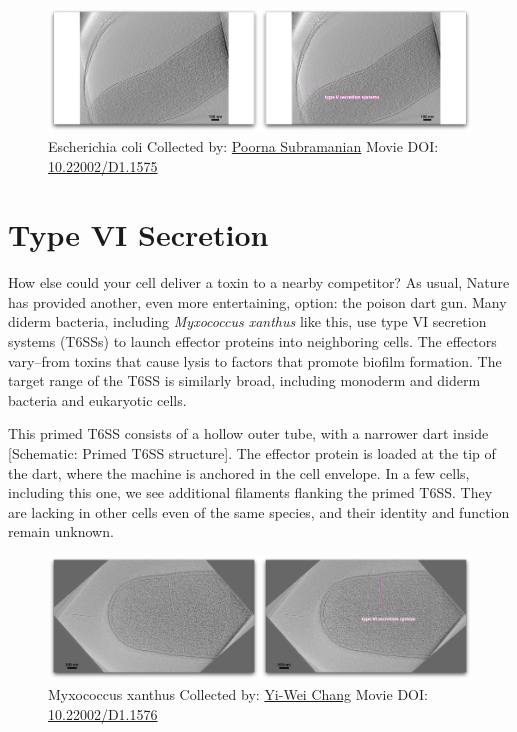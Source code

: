 \documentclass[]{tufte-book}
\begin{document}
\begin{figure}
\includegraphics{movie_stills/9_5} \caption[Escherichia coli Collected by:
\protect\hyperlink{poorna_subramanian}{Poorna Subramanian} Movie DOI:
\href{https://doi.org/10.22002/D1.1575}{10.22002/D1.1575}]{Escherichia coli Collected by:
\protect\hyperlink{poorna_subramanian}{Poorna Subramanian} Movie DOI:
\href{https://doi.org/10.22002/D1.1575}{10.22002/D1.1575}}\label{fig:9-5}
\end{figure}

\section{Type VI Secretion}\label{type-vi-secretion}

How else could your cell deliver a toxin to a nearby competitor? As
usual, Nature has provided another, even more entertaining, option: the
poison dart gun. Many diderm bacteria, including \emph{Myxococcus
xanthus} like this, use type VI secretion systems (T6SSs) to launch
effector proteins into neighboring cells. The effectors vary--from
toxins that cause lysis to factors that promote biofilm formation. The
target range of the T6SS is similarly broad, including monoderm and
diderm bacteria and eukaryotic cells.

This primed T6SS consists of a hollow outer tube, with a narrower dart
inside {[}Schematic: Primed T6SS structure{]}. The effector protein is
loaded at the tip of the dart, where the machine is anchored in the cell
envelope. In a few cells, including this one, we see additional
filaments flanking the primed T6SS. They are lacking in other cells even
of the same species, and their identity and function remain unknown.





\begin{figure}
\includegraphics{movie_stills/9_6} \caption[Myxococcus xanthus Collected by:
\protect\hyperlink{yi-wei_chang}{Yi-Wei Chang} Movie DOI:
\href{https://doi.org/10.22002/D1.1576}{10.22002/D1.1576}]{Myxococcus xanthus Collected by:
\protect\hyperlink{yi-wei_chang}{Yi-Wei Chang} Movie DOI:
\href{https://doi.org/10.22002/D1.1576}{10.22002/D1.1576}}\label{fig:9-6}
\end{figure}
\end{document}
